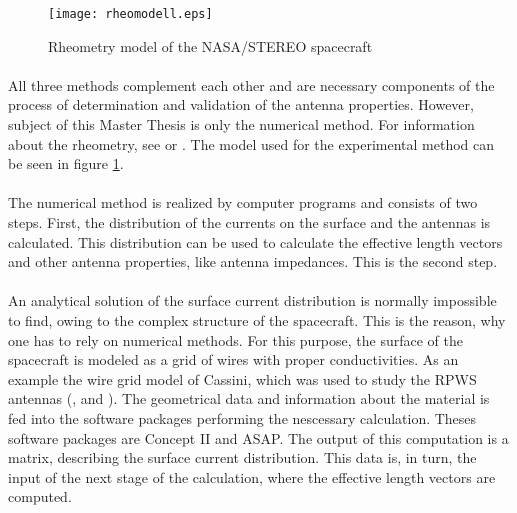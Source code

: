 \documentclass[a4paper,10pt]{thesis}
\begin{document}
\begin{figure}
\begin{center}  %
  \texttt{[image: rheomodell.eps]}\\
\caption{Rheometry model of the NASA/STEREO spacecraft}\label{fig_rheomod}
\end{center}
\end{figure}

\paragraph*{}
All three methods complement each other and are necessary components of the process of determination and validation of the antenna properties. However, subject of this Master Thesis is only the numerical method. For information about the rheometry, see
\cite{rheometry} or \cite{macher_dipl}. The model used for the experimental method can be seen in figure \ref{fig_rheomod}.

\paragraph*{}
The numerical method is realized by computer programs and consists of two steps. First, the distribution of the currents on the surface and the antennas is calculated. This distribution can be used to calculate the effective length vectors and other antenna properties, like antenna impedances. This is the second step.

\paragraph*{}
An analytical solution of the surface current distribution is normally impossible to find, owing to the complex structure of the spacecraft. This is the reason, why one has to rely on numerical methods. For this purpose, the surface of the spacecraft is modeled as a grid of wires with proper conductivities. As an example the wire grid model of Cassini, which was used to study the RPWS antennas (\cite{cassini},
 \cite{cassini2} and
 \cite{cassini3}). The geometrical data and information about the material is fed into the software packages performing the nescessary calculation. Theses software packages are Concept II and ASAP. The output of this computation is a matrix, describing the surface current distribution. This data is, in turn, the input of the next stage of the calculation, where the effective length vectors are computed.
\end{document}
